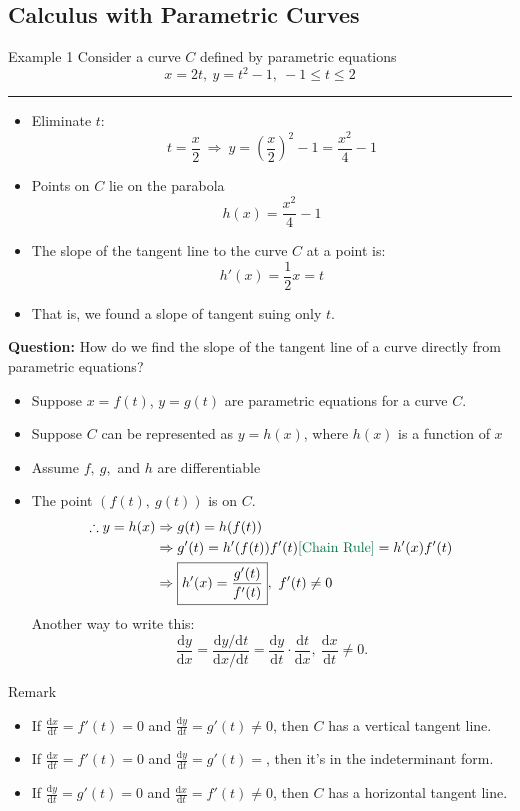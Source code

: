 \documentclass[12pt,a4paper]{article}
\def\d{{\mathrm{d}}}
\def\dx{\d x}
\begin{document}
\subsection{Calculus with Parametric Curves}
\begin{eg}{Example 1}
	Consider a curve $C$ defined by parametric equations \[x=2t,\ y=t^2-1,\ -1\leq t\leq2\]	
	\noindent\rule[0.25\baselineskip]{\textwidth}{1pt}
	\begin{itemize}
		\item Eliminate $t$: \[t=\frac{x}{2}\ \Rightarrow\ y=\left(\frac{x}{2}\right)^2-1=\frac{x^2}{4}-1\]
		\item Points on $C$ lie on the parabola \[h(x)=\frac{x^2}{4}-1\]
		\item The slope of the tangent line to the curve $C$ at a point is: \[h'(x)=\frac{1}{2}x=t\]
		\item That is, we found a slope of tangent suing only $t$. 
	\end{itemize}
\end{eg}
\textbf{Question:} How do we find the slope of the tangent line of a curve directly from parametric equations? 
\begin{itemize}
	\item Suppose $x=f(t)$, $y=g(t)$ are parametric equations for a curve $C$.
	\item Suppose $C$ can be represented as $y=h(x)$, where $h(x)$ is a function of $x$ {\color{green}{[C is a function.]}}
	\item Assume $f,\ g,$ and $h$ are differentiable {\color{green}{(and continuous)}}
	\item The point $(f(t),\ g(t))$ is on $C$. 
	\[\begin{aligned}
		\therefore y=h(x) &\Rightarrow g(t)=h(f(t))\\
		&\Rightarrow g'(t)=h'(f(t))f'(t) {\color{green}{\text{[Chain Rule]}}}=h'(x)f'(t)\\
		&\Rightarrow\boxed{h'(x)=\frac{g'(t)}{f'(t)}},\ f'(t)\neq0
	\end{aligned}\]
	Another way to write this: \[\boxed{\frac{\d y}{\dx}=\frac{\d y/\d t}{\dx/\d t}}=\frac{\d y}{\d t}\cdot\frac{\d t}{\dx},\ \frac{\dx}{\d t}\neq0.\]
\end{itemize}
\begin{rmk}{Remark}
	\begin{itemize}
		\item If $\displaystyle\frac{\d x}{\d t}=f'(t)=0$ and $\displaystyle\frac{\d y}{\d t}=g'(t)\neq0$, then $C$ has a vertical tangent line. 
		\item If $\displaystyle\frac{\d x}{\d t}=f'(t)=0$ and $\displaystyle\frac{\d y}{\d t}=g'(t)=$, then it's in the indeterminant form.
		\item If $\displaystyle\frac{\d y}{\d t}=g'(t)=0$ and $\displaystyle\frac{\d x}{\d t}=f'(t)\neq0$, then $C$ has a horizontal tangent line. 
	\end{itemize}	
\end{rmk}
\end{document}
